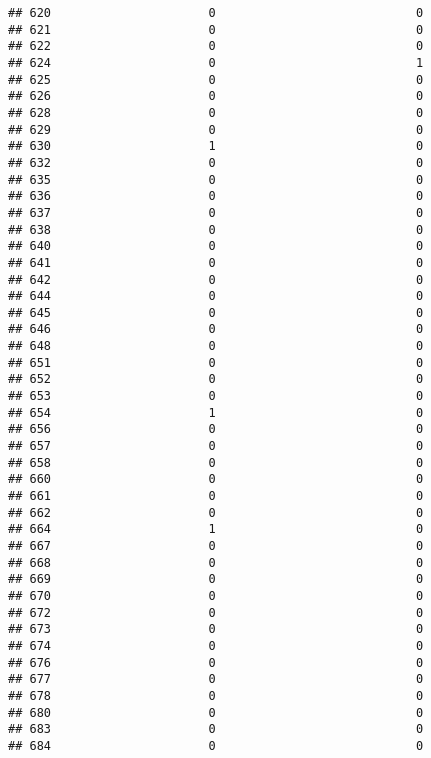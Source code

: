\documentclass[
]{article}
\begin{document}
\begin{verbatim}
## 620                      0                            0
## 621                      0                            0
## 622                      0                            0
## 624                      0                            1
## 625                      0                            0
## 626                      0                            0
## 628                      0                            0
## 629                      0                            0
## 630                      1                            0
## 632                      0                            0
## 635                      0                            0
## 636                      0                            0
## 637                      0                            0
## 638                      0                            0
## 640                      0                            0
## 641                      0                            0
## 642                      0                            0
## 644                      0                            0
## 645                      0                            0
## 646                      0                            0
## 648                      0                            0
## 651                      0                            0
## 652                      0                            0
## 653                      0                            0
## 654                      1                            0
## 656                      0                            0
## 657                      0                            0
## 658                      0                            0
## 660                      0                            0
## 661                      0                            0
## 662                      0                            0
## 664                      1                            0
## 667                      0                            0
## 668                      0                            0
## 669                      0                            0
## 670                      0                            0
## 672                      0                            0
## 673                      0                            0
## 674                      0                            0
## 676                      0                            0
## 677                      0                            0
## 678                      0                            0
## 680                      0                            0
## 683                      0                            0
## 684                      0                            0

\end{verbatim}
\end{document}
